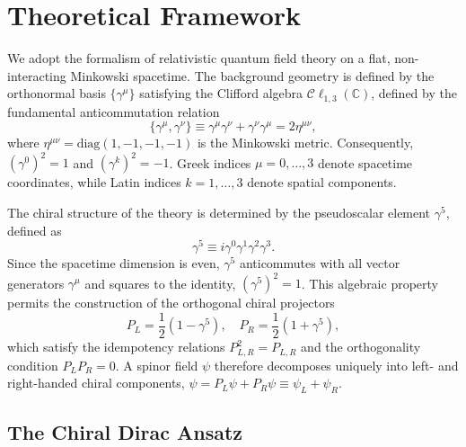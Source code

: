 \section{Theoretical Framework}
\label{sec:Framework}

We adopt the formalism of relativistic quantum field theory on a flat,
non-interacting Minkowski spacetime. The background geometry is defined by the
orthonormal basis $\{ \gamma^\mu \}$ satisfying the Clifford algebra
$\mathcal{C}\ell_{1,3}(\mathbb{C})$, defined by the fundamental anticommutation
relation
\begin{equation}
	\{ \gamma^\mu, \gamma^\nu \} \equiv \gamma^\mu \gamma^\nu + \gamma^\nu
	\gamma^\mu = 2 \eta^{\mu \nu},
\end{equation}
where $\eta^{\mu \nu} = \text{diag}(1, -1, -1, -1)$ is the Minkowski metric.
Consequently, $(\gamma^0)^2 = 1$ and $(\gamma^k)^2 = -1$. Greek indices $\mu =
0, \dots, 3$ denote spacetime coordinates, while Latin indices $k = 1, \dots, 3$
denote spatial components.

The chiral structure of the theory is determined by the pseudoscalar element
$\gamma^5$, defined as
\begin{equation}
	\gamma^5 \equiv i \gamma^0 \gamma^1 \gamma^2 \gamma^3.
\end{equation}
Since the spacetime dimension is even, $\gamma^5$ anticommutes with all vector
generators $\gamma^\mu$ and squares to the identity, $(\gamma^5)^2 = 1$. This
algebraic property permits the construction of the orthogonal chiral projectors
\begin{equation}
	P_L = \frac{1}{2}(1 - \gamma^5), \quad P_R = \frac{1}{2} (1 + \gamma^5),
\end{equation}
which satisfy the idempotency relations $P_{L,R}^2 = P_{L,R}$ and the
orthogonality condition $P_L P_R = 0$. A spinor field $\psi$ therefore
decomposes uniquely into left- and right-handed chiral components, $\psi = P_L
\psi + P_R \psi \equiv \psi_L + \psi_R$.

\subsection{The Chiral Dirac Ansatz}

